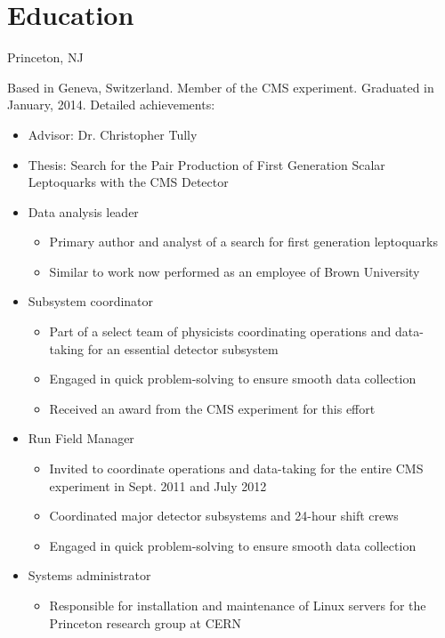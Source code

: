 \section{Education}
 {Princeton, NJ}{}{Based in Geneva, Switzerland.  Member of the CMS experiment. Graduated in January, 2014.\newline{}%
  Detailed achievements:
  \begin{itemize}
  \item Advisor: Dr. Christopher Tully
  \item Thesis: Search for the Pair Production of First Generation Scalar Leptoquarks with the CMS Detector
  \item Data analysis leader
    \begin{itemize}
    \item Primary author and analyst of a search for first generation leptoquarks
    \item Similar to work now performed as an employee of Brown University
    \end{itemize}
  \item Subsystem coordinator
    \begin{itemize}
    \item Part of a select team of physicists coordinating operations and data-taking for an essential detector subsystem
    \item Engaged in quick problem-solving to ensure smooth data collection
    \item Received an award from the CMS experiment for this effort
    \end{itemize}
  \item Run Field Manager
    \begin{itemize}
      \item Invited to coordinate operations and data-taking for the entire CMS experiment in Sept. 2011 and July 2012
      \item Coordinated major detector subsystems and 24-hour shift crews
      \item Engaged in quick problem-solving to ensure smooth data collection
    \end{itemize}
  \item Systems administrator
    \begin{itemize}
      \item Responsible for installation and maintenance of Linux servers for the Princeton research group at CERN
    \end{itemize}
  \end{itemize}
}


